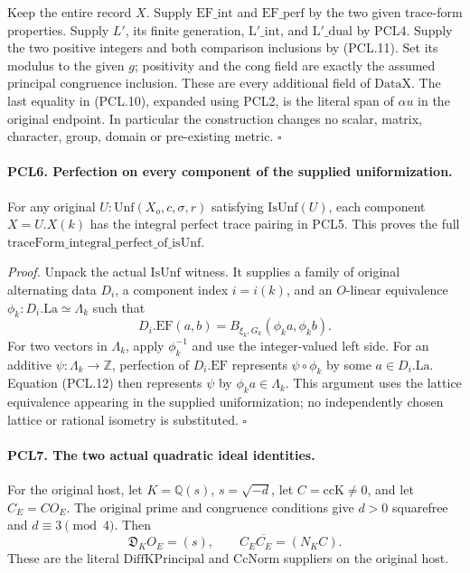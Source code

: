 \documentclass[11pt,a4paper]{article}
\numberwithin{equation}{section}
\theoremstyle{remark}\newtheorem{remark}[theorem]{Remark}
\begin{document}
Keep the entire record \(X\).  Supply \(\mathrm{EF\_\allowbreak int}\)
and \(\mathrm{EF\_\allowbreak perf}\) by the two given trace-form
properties.  Supply \(L'\), its finite generation,
\(\mathrm{L'\_\allowbreak int}\), and \(\mathrm{L'\_\allowbreak dual}\) by PCL4.
Supply the two positive integers and both comparison
inclusions by (PCL.11).  Set its modulus to the given
\(g\); positivity and the \(\mathrm{cong}\) field are
exactly the assumed principal congruence inclusion.
These are every additional field of \(\mathrm{DataX}\).
The last equality in (PCL.10), expanded using PCL2, is
the literal span of \(\alpha u\) in the original endpoint.
In particular the construction changes no scalar,
matrix, character, group, domain or pre-existing metric.
\hfill\(\square\)

\paragraph{PCL6. Perfection on every component of the supplied uniformization.}
\label{claim:PCL6}
For any original \(U:\mathrm{Unf}(X_o,c,\sigma,r)\)
satisfying \(\mathrm{IsUnf}(U)\), each component
\(X=U.X(k)\) has the integral perfect trace pairing
in PCL5.  This proves the full
\(\mathrm{traceForm\_\allowbreak integral\_\allowbreak perfect\_\allowbreak of\_\allowbreak isUnf}\).

\emph{Proof.}
Unpack the actual \(\mathrm{IsUnf}\) witness.  It supplies
a family of original alternating data \(D_i\), a component
index \(i=i(k)\), and an \(O\)-linear equivalence
\(\phi_k:D_i.\mathrm{La}\simeq\Lambda_k\) such that
\[
        D_i.\mathrm{EF}(a,b)
             =B_{\xi_k,G_k}(\phi_k a,\phi_k b).       \tag{PCL.12}
\]
For two vectors in \(\Lambda_k\), apply \(\phi_k^{-1}\)
and use the integer-valued left side.  For an additive
\(\psi:\Lambda_k\to\mathbb Z\), perfection of
\(D_i.\mathrm{EF}\) represents \(\psi\circ\phi_k\)
by some \(a\in D_i.\mathrm{La}\).  Equation (PCL.12)
then represents \(\psi\) by \(\phi_k a\in\Lambda_k\).
This argument uses the lattice equivalence appearing in
the supplied uniformization; no independently chosen
lattice or rational isometry is substituted.
\hfill\(\square\)

\paragraph{PCL7. The two actual quadratic ideal identities.}
\label{claim:PCL7}
For the original host, let \(K=\mathbb Q(s)\),
\(s=\sqrt{-d}\), let \(C=\mathrm{ccK}\ne0\), and
let \(C_E=CO_E\).  The original prime and congruence
conditions give \(d>0\) squarefree and \(d\equiv3\pmod4\).
Then
\[
       \mathfrak D_K O_E=(s),\qquad
          C_E\overline{C_E}=(N_K C).                \tag{PCL.13}
\]
These are the literal \(\mathrm{DiffKPrincipal}\) and
\(\mathrm{CcNorm}\) suppliers on the original host.
\end{document}

